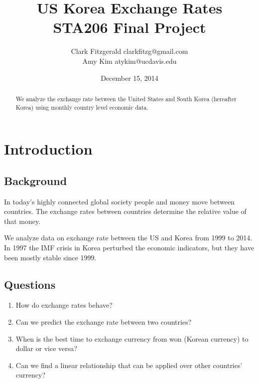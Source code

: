 \documentclass[12pt]{article}
\begin{document}
\title{US Korea Exchange Rates \\ STA206 Final Project}
\date{December 15, 2014}
\author{Clark Fitzgerald clarkfitzg@gmail.com \\ 
        Amy Kim atykim@ucdavis.edu}

\maketitle

\begin{abstract}
    We analyze the exchange rate between the United States and South Korea
    (hereafter Korea) using monthly country level economic data.
\end{abstract}

\section{Introduction}

\subsection{Background}

In today's highly connected global society people and money move between
countries. The exchange rates between countries determine the relative
value of that money.

We analyze data on exchange rate between the US and Korea from 1999 to
2014. In 1997 the IMF crisis in Korea perturbed the economic indicators,
but they have been mostly stable since 1999.

\subsection{Questions}

\begin{enumerate}

    \item How do exchange rates behave?

    \item Can we predict the exchange rate between two countries?  

    \item When is the best time to exchange currency from won (Korean
        currency) to dollar or vice versa?  

    \item Can we find a linear relationship
        that can be applied over other countries' currency? 

\end{enumerate}
\end{document}
